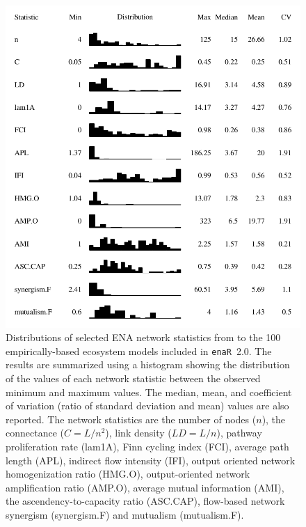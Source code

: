 \documentclass[11pt]{article}
\newcommand{\enaR}{\texttt{enaR}}
\begin{document}
\begin{figure}[t]
\includegraphics[scale=1]{../figures/ns_dist.pdf}
\caption{Distributions of selected ENA network statistics from to the
  100 empirically-based ecosystem models included in \enaR\ 2.0.  The
  results are summarized using a histogram showing the distribution of
  the values of each network statistic between the observed minimum
  and maximum values.  The median, mean, and coefficient of variation
  (ratio of standard deviation and mean) values are also reported.
  The network statistics are the number of nodes ($n$), the
  connectance ($C = L/n^2$), link density ($LD = L/n$), pathway
  proliferation rate (lam1A), Finn cycling index (FCI), average path
  length (APL), indirect flow intensity (IFI), output oriented network
  homogenization ratio (HMG.O), output-oriented network amplification
  ratio (AMP.O), average mutual information (AMI), the
  ascendency-to-capacity ratio (ASC.CAP), flow-based network synergism
  (synergism.F) and mutualism (mutualism.F).} \label{fig:ns}
\end{figure}
\end{document}
